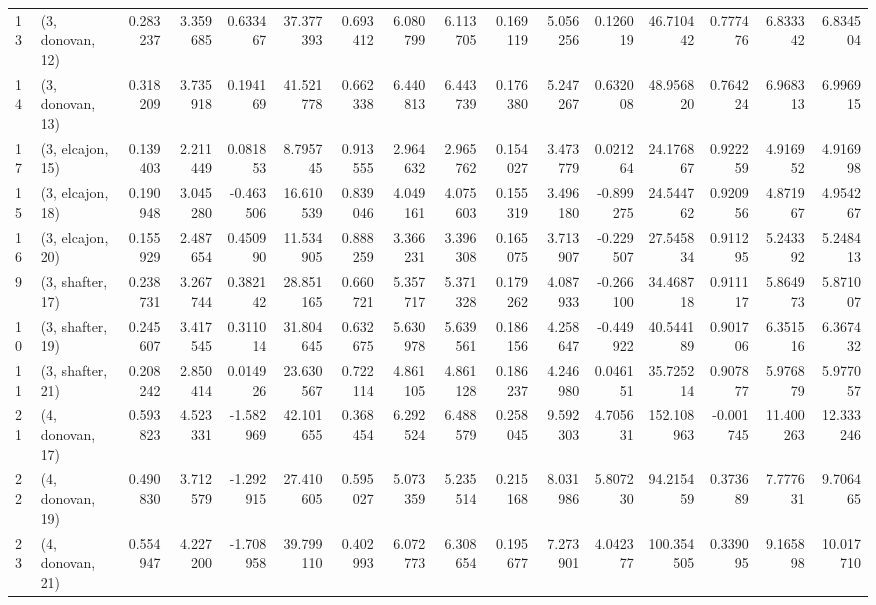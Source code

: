 \begin{tabular}{llrrrrrrrrrrrrrr}
13 &  (3, donovan, 12) &   0.283237 &  3.359685 &  0.633467 &  37.377393 &  0.693412 &   6.080799 &  6.113705 &  0.169119 &   5.056256 &  0.126019 &   46.710442 &  0.777476 &   6.833342 &   6.834504 \\
14 &  (3, donovan, 13) &   0.318209 &  3.735918 &  0.194169 &  41.521778 &  0.662338 &   6.440813 &  6.443739 &  0.176380 &   5.247267 &  0.632008 &   48.956820 &  0.764224 &   6.968313 &   6.996915 \\
17 &  (3, elcajon, 15) &   0.139403 &  2.211449 &  0.081853 &   8.795745 &  0.913555 &   2.964632 &  2.965762 &  0.154027 &   3.473779 &  0.021264 &   24.176867 &  0.922259 &   4.916952 &   4.916998 \\
15 &  (3, elcajon, 18) &   0.190948 &  3.045280 & -0.463506 &  16.610539 &  0.839046 &   4.049161 &  4.075603 &  0.155319 &   3.496180 & -0.899275 &   24.544762 &  0.920956 &   4.871967 &   4.954267 \\
16 &  (3, elcajon, 20) &   0.155929 &  2.487654 &  0.450990 &  11.534905 &  0.888259 &   3.366231 &  3.396308 &  0.165075 &   3.713907 & -0.229507 &   27.545834 &  0.911295 &   5.243392 &   5.248413 \\
9  &  (3, shafter, 17) &   0.238731 &  3.267744 &  0.382142 &  28.851165 &  0.660721 &   5.357717 &  5.371328 &  0.179262 &   4.087933 & -0.266100 &   34.468718 &  0.911117 &   5.864973 &   5.871007 \\
10 &  (3, shafter, 19) &   0.245607 &  3.417545 &  0.311014 &  31.804645 &  0.632675 &   5.630978 &  5.639561 &  0.186156 &   4.258647 & -0.449922 &   40.544189 &  0.901706 &   6.351516 &   6.367432 \\
11 &  (3, shafter, 21) &   0.208242 &  2.850414 &  0.014926 &  23.630567 &  0.722114 &   4.861105 &  4.861128 &  0.186237 &   4.246980 &  0.046151 &   35.725214 &  0.907877 &   5.976879 &   5.977057 \\
21 &  (4, donovan, 17) &   0.593823 &  4.523331 & -1.582969 &  42.101655 &  0.368454 &   6.292524 &  6.488579 &  0.258045 &   9.592303 &  4.705631 &  152.108963 & -0.001745 &  11.400263 &  12.333246 \\
22 &  (4, donovan, 19) &   0.490830 &  3.712579 & -1.292915 &  27.410605 &  0.595027 &   5.073359 &  5.235514 &  0.215168 &   8.031986 &  5.807230 &   94.215459 &  0.373689 &   7.777631 &   9.706465 \\
23 &  (4, donovan, 21) &   0.554947 &  4.227200 & -1.708958 &  39.799110 &  0.402993 &   6.072773 &  6.308654 &  0.195677 &   7.273901 &  4.042377 &  100.354505 &  0.339095 &   9.165898 &  10.017710 \\

\end{tabular}

